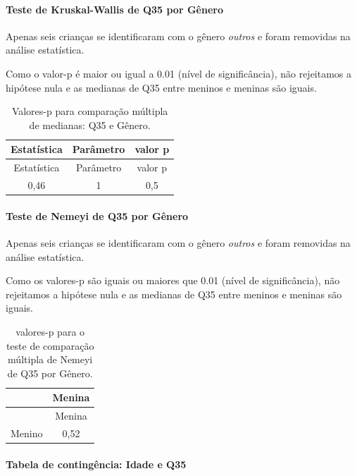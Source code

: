 \documentclass[]{article}
\let\oldparagraph\paragraph
\renewcommand{\paragraph}[1]{\oldparagraph{#1}\mbox{}}
\begin{document}
\hypertarget{teste-de-kruskal-wallis-de-q35-por-guxeanero}{%
\paragraph{Teste de Kruskal-Wallis de Q35 por Gênero}\label{teste-de-kruskal-wallis-de-q35-por-guxeanero}}

Apenas seis crianças se identificaram com o gênero \emph{outros} e foram removidas na análise estatística.

Como o valor-p é maior ou igual a 0.01 (nível de significância), não rejeitamos a hipótese nula e as medianas de Q35 entre meninos e meninas são iguais.

\begin{longtable}[]{@{}ccc@{}}
\caption{\label{tab:unnamed-chunk-1269}Valores-p para comparação múltipla de medianas: Q35 e Gênero.}\tabularnewline
\toprule
Estatística & Parâmetro & valor p\tabularnewline
\midrule
\endfirsthead
\toprule
Estatística & Parâmetro & valor p\tabularnewline
\midrule
\endhead
0,46 & 1 & 0,5\tabularnewline
\bottomrule
\end{longtable}

\hypertarget{teste-de-nemeyi-de-q35-por-guxeanero}{%
\paragraph{Teste de Nemeyi de Q35 por Gênero}\label{teste-de-nemeyi-de-q35-por-guxeanero}}

Apenas seis crianças se identificaram com o gênero \emph{outros} e foram removidas na análise estatística.

Como os valores-p são iguais ou maiores que 0.01 (nível de significância), não rejeitamos a hipótese nula e as medianas de Q35 entre meninos e meninas são iguais.

\begin{longtable}[]{@{}lc@{}}
\caption{\label{tab:unnamed-chunk-1271}valores-p para o teste de comparação múltipla de Nemeyi de Q35 por Gênero.}\tabularnewline
\toprule
& Menina\tabularnewline
\midrule
\endfirsthead
\toprule
& Menina\tabularnewline
\midrule
\endhead
Menino & 0,52\tabularnewline
\bottomrule
\end{longtable}

\cleardoublepage

\hypertarget{tabela-de-continguxeancia-idade-e-q35}{%
\paragraph{Tabela de contingência: Idade e Q35}\label{tabela-de-continguxeancia-idade-e-q35}}
\end{document}
